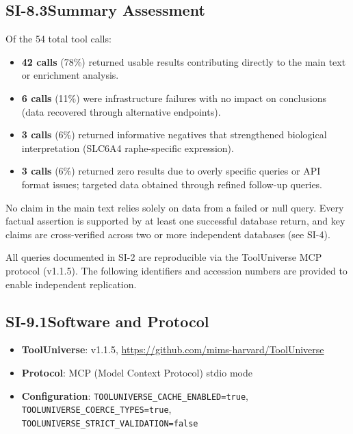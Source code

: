 \subsection*{SI-8.3\quad Summary Assessment}

Of the 54 total tool calls:

\begin{itemize}[nosep]
  \item \textbf{42 calls} (78\%) returned usable results contributing
        directly to the main text or enrichment analysis.
  \item \textbf{6 calls} (11\%) were infrastructure failures with no impact
        on conclusions (data recovered through alternative endpoints).
  \item \textbf{3 calls} (6\%) returned informative negatives that
        strengthened biological interpretation (SLC6A4 raphe-specific
        expression).
  \item \textbf{3 calls} (6\%) returned zero results due to overly specific
        queries or API format issues; targeted data obtained through
        refined follow-up queries.
\end{itemize}

\noindent
No claim in the main text relies solely on data from a failed or null query.
Every factual assertion is supported by at least one successful database
return, and key claims are cross-verified across two or more independent
databases (see SI-4).



All queries documented in SI-2 are reproducible via the ToolUniverse MCP
protocol (v1.1.5).  The following identifiers and accession numbers are
provided to enable independent replication.

\subsection*{SI-9.1\quad Software and Protocol}

\begin{itemize}[nosep]
  \item \textbf{ToolUniverse}: v1.1.5,
        \url{https://github.com/mims-harvard/ToolUniverse}
  \item \textbf{Protocol}: MCP (Model Context Protocol) stdio mode
  \item \textbf{Configuration}: \texttt{TOOLUNIVERSE\_CACHE\_ENABLED=true},
        \texttt{TOOLUNIVERSE\_COERCE\_TYPES=true},
        \texttt{TOOLUNIVERSE\_STRICT\_VALIDATION=false}
\end{itemize}

